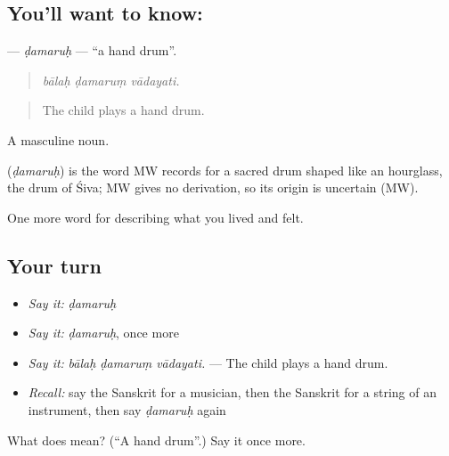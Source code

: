 \subsection*{You'll want to know: }
\textbf{} — \emph{ḍamaruḥ} — \textquotedblleft{}a hand drum\textquotedblright{}.

\begin{quote}
  
\end{quote}

\begin{quote}
\emph{bālaḥ ḍamaruṃ vādayati.}
\end{quote}

\begin{quote}
The child plays a hand drum.
\end{quote}

A masculine noun.

\begin{cousinweb}
\textbf{} (\emph{ḍamaruḥ}) is the word MW records for a sacred drum shaped like an hourglass, the drum of Śiva; MW gives no derivation, so its origin is uncertain (MW).
\end{cousinweb}

\begin{grammarlens}[title={What you've built}]
One more word for describing what you lived and felt.
\end{grammarlens}

\subsection*{Your turn}
\begin{itemize}
\raggedright
  \item \emph{Say it:} \emph{ḍamaruḥ}
  \item \emph{Say it:} \emph{ḍamaruḥ}, once more
  \item \emph{Say it:} \emph{bālaḥ ḍamaruṃ vādayati.} — The child plays a hand drum.
  \item \emph{Recall:} say the Sanskrit for a musician, then the Sanskrit for a string of an instrument, then say \emph{ḍamaruḥ} again
\end{itemize}

\begin{tcolorbox}[breakable,colback=teal!4,colframe=teal!35!black,title={Before you move on}]
What does  mean? (\textquotedblleft{}A hand drum\textquotedblright{}.) Say it once more.
\end{tcolorbox}
